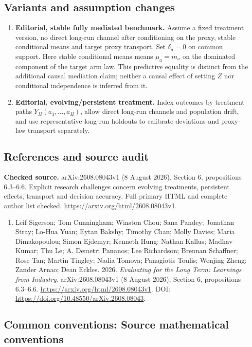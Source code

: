 \documentclass[11pt,a4paper]{article}
\begin{document}
\subsection*{Variants and assumption changes}
\begin{enumerate}
\item \textbf{Editorial, stable fully mediated benchmark.} Assume a fixed treatment version, no direct long-run channel after conditioning on the proxy, stable conditional means and target proxy transport. Set \(\delta_a=0\) on common support. Here stable conditional means means \(\mu_a=m_a\) on the dominated component of the target arm law. This predictive equality is distinct from the additional causal mediation claim; neither a causal effect of setting \(Z\) nor conditional independence is inferred from it.
\item \textbf{Editorial, evolving/persistent treatment.} Index outcomes by treatment paths \(Y_H(a_1,\ldots,a_H)\), allow direct long-run channels and population drift, and use representative long-run holdouts to calibrate deviations and proxy-law transport separately.
\end{enumerate}
\subsection*{References and source audit}
\textbf{Checked source.} arXiv:2608.08043v1 (8 August 2026), Section 6, propositions 6.3--6.6. Explicit research challenges concern evolving treatments, persistent effects, transport and decision accuracy. Full primary HTML and complete author list checked. \url{https://arxiv.org/html/2608.08043v1}.
\begin{enumerate}\raggedright
\item\hypertarget{definitions:source:30007711:1}{} Leif Sigerson; Tom Cunningham; Winston Chou; Sana Pandey; Jonathan Stray; Lo-Hua Yuan; Eytan Bakshy; Timothy Chan; Molly Davies; Maria Dimakopoulou; Simon Ejdemyr; Kenneth Hung; Nathan Kallus; Madhav Kumar; Thu Le; A. Demetri Pananos; Lee Richardson; Brennan Schaffner; Rose Tan; Martin Tingley; Nadia Tomova; Panagiotis Toulis; Wenjing Zheng; Zander Arnao; Dean Eckles. 2026. \emph{Evaluating for the Long Term: Learnings from Industry}. arXiv:2608.08043v1 (8 August 2026), Section 6, propositions 6.3--6.6.
\url{https://arxiv.org/html/2608.08043v1}.
DOI: \url{https://doi.org/10.48550/arXiv.2608.08043}.
\end{enumerate}

\subsection*{Common conventions: Source mathematical conventions}
\end{document}
